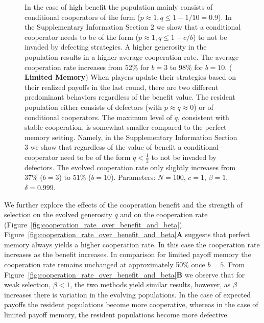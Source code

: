 \documentclass[11pt]{article}
\theoremstyle{plainCl1}
\theoremstyle{plainCl2}
\begin{document}
\begin{figure}[!htbp]
{    In the case of high benefit the population mainly consists of conditional
    cooperators of the form ($p\!\approx\!1\!, q\!\le\!1\!-\!1/10\!=\!0.9$). In
    the Supplementary Information Section 2 we show that a conditional
    cooperator needs to be of the form ($p\!\approx\!1\!, q\!\le\!1\!-\!c/b$) to
    not be invaded by defecting strategies. A higher generosity in the
    population results in a higher average cooperation rate. The average
    cooperation rate increases from 52\% for \(b=3\) to 98\% for \(b=10\). ({\bf
    Limited Memory}) When players update their strategies based on their
    realized payoffs in the last round, there are two different predominant
    behaviors regardless of the benefit value. The resident population either
    consists of defectors (with $p\!\approx\!q\!\approx\!0$) or of conditional
    cooperators. The maximum level of $q$, consistent with stable cooperation, is
    somewhat smaller compared to the perfect memory setting.
    Namely, in the Supplementary Information Section 3 we show that
    regardless of the value of benefit a conditional cooperator need to be of
    the form $q\!<\!\frac{1}{2}$ to not be invaded by defectors.
    The evolved cooperation
    rate only slightly increases from 37\% ($b=3$) to 51\% ($b=10$). Parameters: $N\!=\!100$,
    $c\!=\!1$, $\beta\!=\!1$, $\delta\!=\!0.999$.}
    \label{fig:expected_and_stochastic_for_donation}
\end{figure}

We further explore the effects of the cooperation benefit and the strength of
selection on the evolved generosity \(q\) and on the cooperation rate
(Figure~\ref{fig:cooperation_rate_over_benefit_and_beta}).
Figure~\ref{fig:cooperation_rate_over_benefit_and_beta}\textbf{A} suggests that
perfect memory always yields a higher cooperation rate. In this case the
cooperation rate increases as the benefit increases. In comparison for limited
payoff memory the cooperation rate remains unchanged at approximately 50\% once
\(b=5\).  From Figure~\ref{fig:cooperation_rate_over_benefit_and_beta}\textbf{B}
we observe that for weak selection, \(\beta < 1\), the two methods yield similar
results, however, as \(\beta\) increases there is variation in the evolving
populations. In the case of expected payoffs the resident populations become
more cooperative, whereas in the case of limited payoff memory, the resident
populations become more defective.
\end{document}
